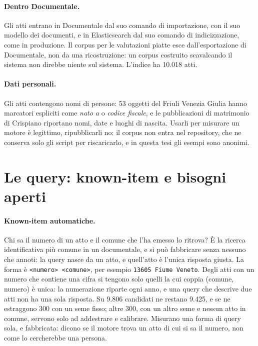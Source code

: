 \paragraph{Dentro Documentale.} Gli atti entrano in Documentale dal suo comando di
importazione, con il suo modello dei documenti, e in Elasticsearch dal suo comando
di indicizzazione, come in produzione. Il corpus per le valutazioni piatte esce
dall'esportazione di Documentale, non da una ricostruzione: un corpus costruito
scavalcando il sistema non direbbe niente sul sistema. L'indice ha 10.018 atti.

\paragraph{Dati personali.} Gli atti contengono nomi di persone: 53 oggetti del
Friuli Venezia Giulia hanno marcatori espliciti come \emph{nato a} o
\emph{codice fiscale}, e le pubblicazioni di
matrimonio di Crispiano riportano nomi, date e luoghi di nascita. Usarli per
misurare un motore è legittimo, ripubblicarli no: il corpus non entra nel
repository, che ne conserva solo gli script per riscaricarlo, e in questa tesi gli
esempi sono anonimi.

\section{Le query: known-item e bisogni aperti}\label{sec:query}

\paragraph{Known-item automatiche.} Chi sa il numero di un atto e il comune che
l'ha emesso lo ritrova? È la ricerca identificativa più comune in un documentale,
e si può fabbricare senza nessuno che annoti: la query nasce da un atto, e
quell'atto è l'unica risposta giusta. La forma è \texttt{<numero> <comune>}, per
esempio \texttt{13605 Fiume Veneto}. Degli atti con un numero che contiene una
cifra si tengono solo quelli la cui coppia (comune, numero) è unica: la
numerazione riparte ogni anno, e una query che descrive due atti non ha una sola
risposta. Su 9.806 candidati ne restano 9.425, e se ne estraggono 300 con un seme
fisso; altre 300, con un altro seme e nessun atto in comune, servono solo ad
addestrare e calibrare. Misurano una forma di query sola, e fabbricata: dicono se
il motore trova un atto di cui si sa il numero, non come lo cercherebbe una
persona.

